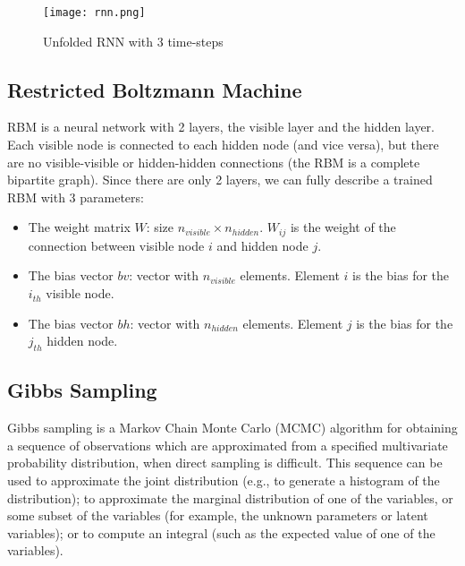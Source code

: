 \documentclass[journal, a4paper]{IEEEtran}
\begin{document}
\begin{enumerate}
	\begin{figure}[!hbt]
		\begin{center}
		\texttt{[image: rnn.png]}
		\caption{Unfolded RNN with 3 time-steps}
		\label{fig:rnn}
		\end{center}
	\end{figure}


\end{enumerate}


\subsection{Restricted Boltzmann Machine}
	RBM is a neural network with 2 layers, the visible layer and the hidden layer. Each visible node is connected to each hidden node (and vice versa), but there are no visible-visible or hidden-hidden connections (the RBM is a complete bipartite graph). Since there are only 2 layers, we can fully describe a trained RBM with 3 parameters:
\begin{itemize}
\item The weight matrix $W$: size $n_{visible} \times n_{hidden}$. $W_{ij}$ is the weight of the connection between visible node $i$ and hidden node $j$.
\item The bias vector $bv$: vector with $n_{visible}$ elements. Element $i$ is the bias for the $i_{th}$ visible node.
\item The bias vector $bh$: vector with $n_{hidden}$ elements. Element $j$ is the bias for the $j_{th}$ hidden node.
\end{itemize}

\subsection{Gibbs Sampling}
	Gibbs sampling is a Markov Chain Monte Carlo (MCMC) algorithm for obtaining a sequence of observations which are approximated from a specified multivariate probability distribution, when direct sampling is difficult. This sequence can be used to approximate the joint distribution (e.g., to generate a histogram of the distribution); to approximate the marginal distribution of one of the variables, or some subset of the variables (for example, the unknown parameters or latent variables); or to compute an integral (such as the expected value of one of the variables). 
    
\end{document}
